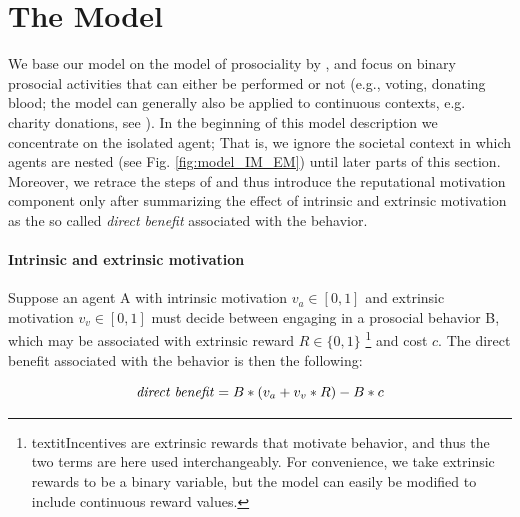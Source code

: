 \documentclass[AER]{AEA}
\begin{document}
\section{The Model}

We base our model on the model of prosociality by \cite{benabou_incentives_2006}, and focus on binary prosocial activities that can either be performed or not (e.g., voting, donating blood; the model can generally also be applied to continuous contexts, e.g. charity donations, see \cite{benabou_incentives_2006}). In the beginning of this model description we concentrate on the isolated agent; That is, we ignore the societal context in which agents are nested (see Fig.  \ref{fig:model_IM_EM}) until later parts of this section. Moreover, we retrace the steps of \cite{benabou_incentives_2006} and thus introduce the reputational motivation component only after summarizing the effect of intrinsic and extrinsic motivation as the so called \textit{direct benefit} associated with the behavior.

\paragraph{Intrinsic and extrinsic motivation}

Suppose an agent A with intrinsic motivation $v_{a} \in [0,1]$ and extrinsic motivation $v_{v} \in [0,1]$ must decide between engaging in a prosocial behavior B, which may be associated with extrinsic reward $R \in \{0,1\}$ \footnote{textit{Incentives} are extrinsic rewards that motivate behavior, and thus the two terms are here used interchangeably. For convenience, we take extrinsic rewards to be a binary variable, but the model can easily be modified to include continuous reward values.} and cost $c$. The direct benefit associated with the behavior is then the following: 

$$ \mbox{\textit{direct benefit}} = B * (v_{a} + v_{v} * R) - B * c $$
\end{document}
